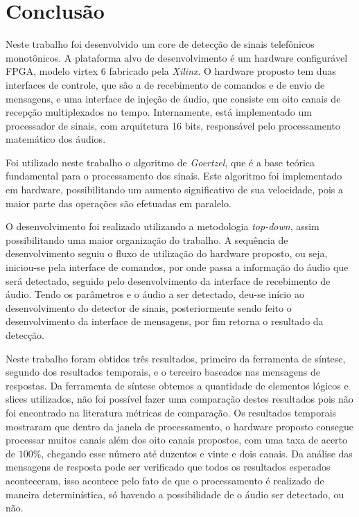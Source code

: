 \documentclass[monografia]{subfiles}
\begin{document}
	\chapter{Conclusão}
		Neste trabalho foi desenvolvido um core de detecção de sinais telefônicos monotônicos. A plataforma alvo de desenvolvimento é um hardware
		configurável FPGA, modelo  virtex 6 fabricado pela \textit{Xilinx}. 
		O hardware proposto tem duas interfaces de controle, que são a de recebimento de comandos e de envio de mensagens, 
		e uma interface de injeção de áudio, que consiste em oito canais de recepção multiplexados no tempo.
		Internamente, está implementado um processador de sinais, com arquitetura 16 bits, responsável pelo processamento matemático dos áudios.

		Foi utilizado neste trabalho o algoritmo de \textit{Goertzel}, que é a base teórica fundamental para o processamento dos sinais. Este algoritmo foi 
		implementado em hardware, possibilitando um aumento significativo de sua velocidade, pois a maior parte das operações são efetuadas em paralelo.

		O desenvolvimento foi realizado utilizando a metodologia \textit{top-down}, assim possibilitando uma maior organização do trabalho. A sequência de
		desenvolvimento seguiu o fluxo de utilização do hardware proposto, ou seja, iniciou-se pela interface de comandos, por onde passa a informação
		do áudio que será detectado, seguido pelo desenvolvimento da interface de recebimento de áudio. Tendo os parâmetros e o áudio a ser detectado, 
		deu-se início ao desenvolvimento do detector de sinais, posteriormente sendo feito o desenvolvimento da interface de mensagens, por fim retorna o resultado
		da detecção.

		Neste trabalho foram obtidos três resultados, primeiro da ferramenta de síntese, segundo dos resultados temporais, e 
		o terceiro baseados nas mensagens de respostas. Da ferramenta de síntese 
		obtemos a quantidade de elementos lógicos e slices utilizados, não foi possível fazer uma comparação destes resultados pois não foi encontrado na
		literatura métricas de comparação. Os resultados temporais mostraram que dentro da janela de processamento, o hardware proposto consegue processar muitos 
		canais além dos oito canais propostos, com uma taxa de acerto de $100\%$, chegando esse número até 
		duzentos e vinte e dois canais. Da análise das mensagens de resposta pode ser verificado que todos os resultados
		esperados aconteceram, isso acontece pelo fato de que o processamento é realizado de maneira determinística, só havendo a possibilidade de o áudio ser 
		detectado, ou não.
\end{document}
